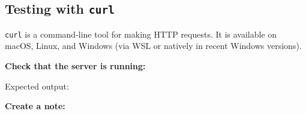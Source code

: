 \subsection*{\texorpdfstring{Testing with \texttt{curl}}{Testing with curl}}\label{04-request-handling-paths:testing-with-curl}

\texttt{curl} is a command-line tool for making HTTP requests. It is available on macOS, Linux, and Windows (via WSL or natively in recent Windows versions).

\textbf{Check that the server is running:}

\begin{codebox}[short]

\begin{Shaded}
\begin{Highlighting}[]
\end{Highlighting}
\end{Shaded}

\end{codebox}

\noindent{}Expected output:

\begin{codebox}[short]

\begin{Shaded}
\begin{Highlighting}[]
\FunctionTok{\{}\FunctionTok{:}\FunctionTok{\}}
\end{Highlighting}
\end{Shaded}

\end{codebox}

\noindent{}\textbf{Create a note:}

\begin{codebox}[short]

\begin{Shaded}
\begin{Highlighting}[]
 \DataTypeTok{\textbackslash{}}
    \DataTypeTok{\textbackslash{}}
   
\end{Highlighting}
\end{Shaded}

\end{codebox}


